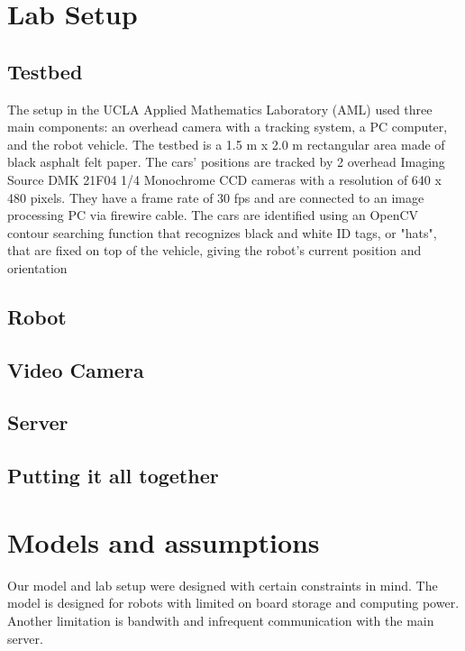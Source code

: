 \documentclass[english]{article}\usepackage[]{graphicx}\usepackage[]{color}
\begin{document}
\section{Lab Setup}
\subsection{Testbed}
The setup in the UCLA Applied Mathematics Laboratory (AML) used three main components: an overhead camera with a tracking system, a PC computer, and the robot vehicle. The testbed is a 1.5 m x 2.0 m rectangular area made of black asphalt felt paper. The cars' positions are tracked by 2 overhead Imaging Source DMK 21F04 1/4 Monochrome CCD cameras with a resolution of 640 x 480 pixels. They have a frame rate of 30 fps and are connected to an image processing PC via firewire cable. The cars are identified using an OpenCV contour searching function that recognizes black and white ID tags, or "hats", that are fixed on top of the vehicle, giving the robot's current position and orientation \cite{gonzalez2011third}

\subsection{Robot}
\subsection{Video Camera}
\subsection{Server}
\subsection{Putting it all together}

\section{Models and assumptions}
Our model and lab setup were designed with certain constraints in mind. The model is designed for robots with limited on board storage and computing power. Another limitation is bandwith and infrequent communication with the main server. 
\end{document}
